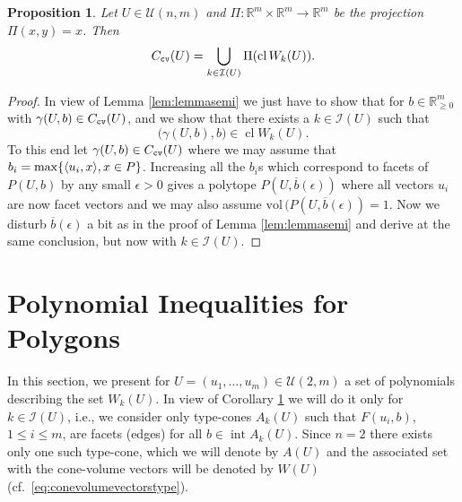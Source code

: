 \documentclass[11pt, a4paper, twoside, reqno]{amsart}
\DeclareMathOperator*{\cl}{cl}
\DeclareMathOperator*{\inter}{int}
\newcommand{\R}{\mathbb{R}}
\newtheorem{proposition}[theorem]{Proposition}
\theoremstyle{definition}
\theoremstyle{remark}
\newcommand{\vol}{\mathrm{vol}\,}
\newcommand{\cv}{{\tt cv}}
\numberwithin{equation}{section}
\begin{document}
\begin{proposition} Let $U\in\mathcal{U}(n,m)$ and $\Pi :\R^{m}\times \R^m\to\R^m$ be the projection $\Pi(x,y)=x$. Then
  \begin{equation*}
      C_\cv(U)= \bigcup_{k\in \mathcal{I}(U)} \Pi(\cl W_k(U)).
    \end{equation*}
    \label{Proposition:PconeEqualsProjectionOfTypes}
\end{proposition}
\begin{proof} In view of Lemma \ref{lem:lemmasemi} we just have to show 
that for  $b\in\R^m_{\geq 0}$ with  $\gamma(U,b)\in
  C_\cv(U)$, and we show that there exists a $k\in \mathcal{I}(U)$ such that
\begin{equation*}
         \big(\gamma(U,b), b\big)\in \cl W_k(U).
       \end{equation*}
To this end let $\gamma(U,b)\in C_\cv(U)$ where we may assume that %
  $b_i=\max\{\langle u_i, x\rangle, \linebreak  x\in P\}$.
  Increasing all the $b_i$s which correspond to facets of $P(U,b)$  by any small $\epsilon>0$ gives a polytope $P(U, \overline{b}(\epsilon))$
  where all vectors $u_i$ are now facet vectors and we may also assume $\vol(P(U, \overline{b}(\epsilon))=1$. Now we disturb $\overline{b}(\epsilon)$ a bit as in the proof of Lemma \ref{lem:lemmasemi} and derive at the same conclusion, but now with $k\in \mathcal{I}(U)$.
\end{proof}


\section{Polynomial Inequalities for Polygons}

In this section, we present for $U=(u_1,\dots,u_m)\in\mathcal{U}(2,m)$ a set of polynomials describing the set \(
W_k(U) \). In view of Corollary
\ref{Proposition:PconeEqualsProjectionOfTypes} we will do it only for
$k\in\mathcal{I}(U)$, i.e., we consider only type-cones $A_k(U)$ such
that $F(u_i,b)$, $1\leq i\leq m$, are facets (edges) for all
$b\in\inter A_k(U)$. Since $n=2$ there exists only one such type-cone,
which we will denote by $A(U)$ and the associated set with the cone-volume
vectors will be denoted by $W(U)$ (cf.~\eqref{eq:conevolumevectorstype}).
\end{document}
